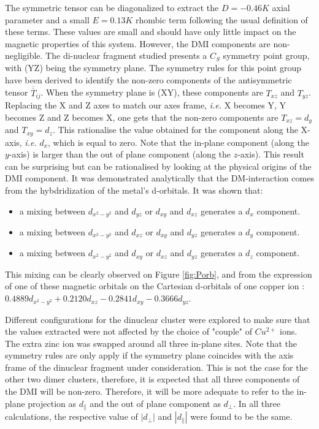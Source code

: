 \documentclass[12pt]{report}
\numberwithin{equation}{section}
\begin{document}
The symmetric tensor can be diagonalized to extract the $ D = - 0.46 K $ axial parameter and a small $ E = 0.13 K$ rhombic term following the usual definition of these terms.
These values are small and should have only little impact on the magnetic properties of this system.
However, the DMI components are non-negligible. 
The di-nuclear fragment studied presents a $C_S$ symmetry point group, with (YZ) being the symmetry plane. 
The symmetry rules for this point group have been derived to identify the non-zero components of the antisymmetric tensor $\overline{\overline{T}}_{ij}$.
When the symmetry plane is (XY), these components are $T_{xz}$ and $T_{yz}$.
Replacing the X and Z axes to match our axes frame, \textit{i.e.} X becomes Y, Y becomes Z and Z becomes X, one gets that the non-zero components are $T_{xz}=d_y$ and $T_{xy}=d_z$.
This rationalise the value obtained for the component along the X-axis, \textit{i.e.} $d_x$, which is equal to zero.
Note that the in-plane component (along the $y$-axis) is larger than the out of plane component (along the $z$-axis). 
This result can be surprising but can be rationalised by looking at the physical origins of the DMI component.
It was demonstrated analytically that the DM-interaction comes from the hybdridization of the metal's d-orbitals. 
It was shown that:
\begin{itemize}
    \item a mixing between $ d_{x^2-y^2}$ and $ d_{yz}$ or $ d_{xy}$ and $d_{xz}$ generates a $ d_{x}$ component.
    \item a mixing between $d_{x^2-y^2}$ and $ d_{xz}$ or $ d_{xy}$ and $d_{yz}$ generates a $ d_{y}$ component.
    \item a mixing between $ d_{x^2-y^2}$ and $d_{xy}$ or $ d_{xz}$ and $d_{yz}$ generates a $ d_{z}$ component.
\end{itemize}

This mixing can be clearly observed on Figure \ref{fig:Porb}, and from the expression of one of these magnetic orbitals on the Cartesian
d-orbitals of one copper ion : $0.4889d_{x^2-y^2}+0.2120d_{xz}-0.2841d_{xy}-0.3666d_{yz}$. 




Different configurations for the dinuclear cluster were explored to make sure that the values extracted were not affected by the choice of "couple" of $Cu^{2+}$ ions. 
The extra zinc ion was swapped around all three in-plane sites. 
Note that the symmetry rules are only apply if the symmetry plane coincides with the axis frame of the dinuclear fragment under consideration.
This is not the case for the other two dimer clusters, therefore, it is expected that all three components of the DMI will be non-zero.
Therefore, it will be more adequate to refer to the in-plane projection as $d_{\parallel}$ and the out of plane component as $d_{\perp}$.
In all three calculations, the respective value of $|d_{\perp}|$ and $|d_{\parallel}|$ were found to be the same.
\end{document}
